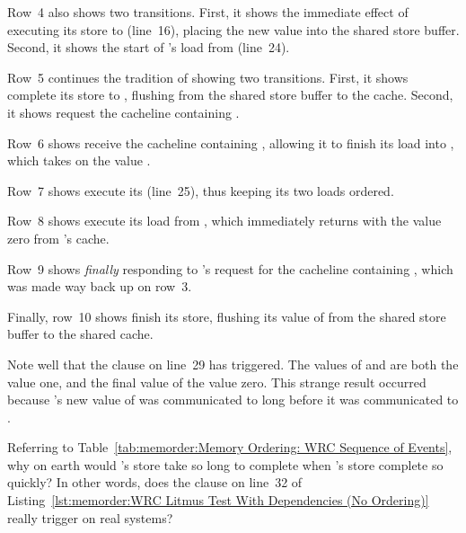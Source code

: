 Row~4 also shows two transitions.
First, it shows the immediate effect of  executing its store to
 (line~16), placing the new value into the shared store buffer.
Second, it shows the start of 's load from  (line~24).

Row~5 continues the tradition of showing two transitions.
First, it shows  complete its store to , flushing
from the shared store buffer to the cache.
Second, it shows  request the cacheline containing .

Row~6 shows  receive the cacheline containing , allowing
it to finish its load into , which takes on the value .

Row~7 shows  execute its  (line~25), thus keeping
its two loads ordered.

Row~8 shows  execute its load from , which immediately
returns with the value zero from 's cache.

Row~9 shows  \emph{finally} responding to 's request for
the cacheline containing , which was made way back up on row~3.

Finally, row~10 shows  finish its store, flushing its value of
 from the shared store buffer to the shared cache.

Note well that the  clause on line~29 has triggered.
The values of  and  are both the value one, and
the final value of  the value zero.
This strange result occurred because 's new value of  was
communicated to  long before it was communicated to .

\QuickQuiz{}
	Referring to
	Table~\ref{tab:memorder:Memory Ordering: WRC Sequence of Events},
	why on earth would 's store take so long to complete when
	's store complete so quickly?
	In other words, does the  clause on line~32 of
	Listing~\ref{lst:memorder:WRC Litmus Test With Dependencies (No Ordering)}
	really trigger on real systems?
 \QuickQuizEnd

